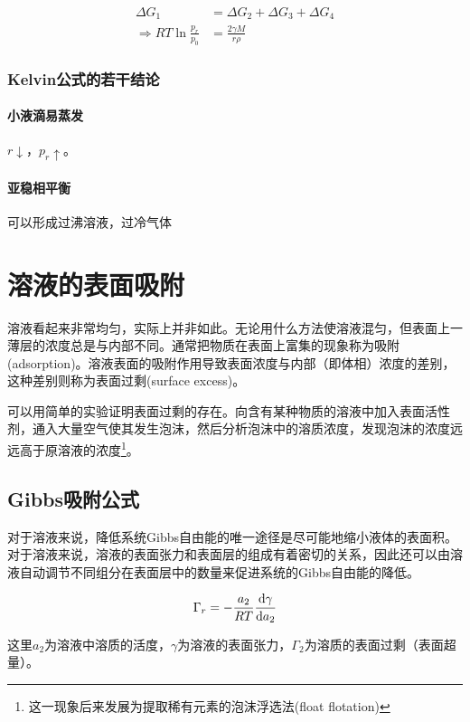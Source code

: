 \begin{align*}
    \Delta G_1                         & = \Delta G_2 + \Delta G_3 + \Delta G_4 \\
    \Rightarrow RT \ln \frac{p_r}{p_0} & = \frac{2 \gamma M}{r \rho}
\end{align*}

\subsubsection{Kelvin公式的若干结论}

\paragraph{小液滴易蒸发} $r \downarrow$，$p_r \uparrow$。

\paragraph{亚稳相平衡} 可以形成过沸溶液，过冷气体

\section{溶液的表面吸附}

溶液看起来非常均匀，实际上并非如此。无论用什么方法使溶液混匀，但表面上一薄层的浓度总是与内部不同。通常把物质在表面上富集的现象称为吸附(adsorption)。溶液表面的吸附作用导致表面浓度与内部（即体相）浓度的差别，这种差别则称为表面过剩(surface excess)。

可以用简单的实验证明表面过剩的存在。向含有某种物质的溶液中加入表面活性剂，通入大量空气使其发生泡沫，然后分析泡沫中的溶质浓度，发现泡沫的浓度远远高于原溶液的浓度\footnote{这一现象后来发展为提取稀有元素的泡沫浮选法(float flotation)}。

\subsection{Gibbs吸附公式}

对于溶液来说，降低系统Gibbs自由能的唯一途径是尽可能地缩小液体的表面积。对于溶液来说，溶液的表面张力和表面层的组成有着密切的关系，因此还可以由溶液自动调节不同组分在表面层中的数量来促进系统的Gibbs自由能的降低。


\begin{equation*}
    \Gamma_r = - \frac{a_2}{RT} \frac{\mathrm{d} \gamma}{\mathrm{d} a_2}
\end{equation*}

这里$a_2$为溶液中溶质的活度，$\gamma$为溶液的表面张力，$\Gamma_2$为溶质的表面过剩（表面超量）。

